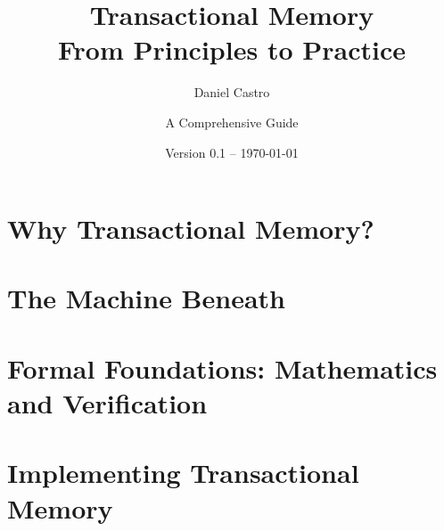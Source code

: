 \documentclass[12pt,a4paper,openany]{book}
\author{Daniel Castro}
\begin{document}
\frontmatter
\title{\textbf{Transactional Memory\\[3mm]\Large From Principles to Practice}}
\author{A Comprehensive Guide}
\date{Version 0.1 -- \today}
\maketitle

\tableofcontents

\listoffigures
\listoftables
\lstlistoflistings





\mainmatter



\part{Why Transactional Memory?}



\part{The Machine Beneath}



\part{Formal Foundations: Mathematics and Verification}




\part{Implementing Transactional Memory}



\end{document}

